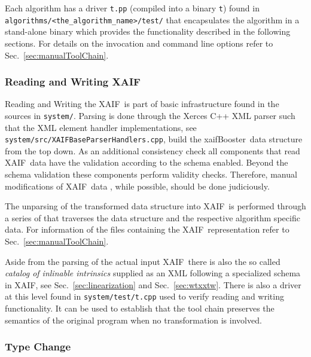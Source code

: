 \documentclass{book}
\newcommand{\xaif}{XAIF}
\newcommand{\xaifBooster}{xaifBooster}
\newcommand{\refsec}[1]{{Sec.~\ref{#1}}}
\begin{document}
Each algorithm has a driver \lstinline{t.pp} (compiled into a binary \lstinline{t}) 
found in \lstinline{algorithms/<the_algorithm_name>/test/} 
that encapsulates the algorithm 
in a stand-alone binary which provides the functionality described 
in the following 
sections. For details on the invocation and command line options refer to 
\refsec{sec:manualToolChain}.

\subsubsection{Reading and Writing \xaif}\label{sec:readWriteXaif}
Reading and Writing the \xaif\ is part of basic infrastructure
found in the sources in \lstinline{system/}.
Parsing is done through the Xerces C++ XML parser \cite{xercesWeb}
such that the XML element handler implementations, see \lstinline{system/src/XAIFBaseParserHandlers.cpp},
build the \xaifBooster\ data 
structure from the top down. 
As an additional consistency check all components that read \xaif\ data 
have the validation according to the schema enabled. Beyond the schema 
validation these components perform validity checks. Therefore, 
manual modifications of \xaif\ data , while possible, should 
be done judiciously. 

The unparsing of the transformed data structure into \xaif\ is performed 
through a series of that traverses the data structure and the 
respective algorithm specific data. 
For information of the files containing the \xaif\ representation refer to 
\refsec{sec:manualToolChain}.

Aside from the parsing of the actual input \xaif\ there is also the so called 
{\em 
  catalog of inlinable intrinsics
} 
supplied as an XML following a specialized schema in \xaif, see  
\refsec{sec:linearization} and \refsec{sec:wtxxtw}.
There is also a driver at this level found in \lstinline{system/test/t.cpp} used 
to verify reading and writing functionality. It can be used to establish 
that the tool chain preserves the semantics of the original program when 
no transformation is involved. 

\subsubsection{Type Change}\label{sec:typechange}
\end{document}

